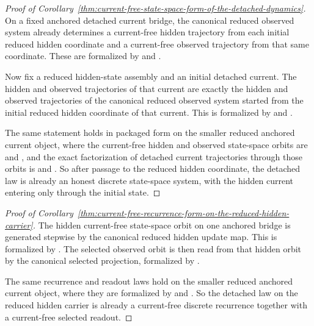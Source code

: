 \begin{proof}[Proof of Corollary~\ref{thm:current-free-state-space-form-of-the-detached-dynamics}]
\label{proof:thm:current-free-state-space-form-of-the-detached-dynamics}
On a fixed anchored detached current bridge, the canonical reduced observed
system already determines a current-free hidden trajectory from each initial
reduced hidden coordinate and a current-free observed trajectory from that same
coordinate. These are formalized by
and
.

Now fix a reduced hidden-state assembly and an initial detached current. The
hidden and observed trajectories of that current are exactly the hidden and
observed trajectories of the canonical reduced observed system started from the
initial reduced hidden coordinate of that current. This is formalized by
and
.

The same statement holds in packaged form on the smaller reduced anchored
current object, where the current-free hidden and observed state-space orbits
are
and
,
and the exact factorization of detached current trajectories through those
orbits is
and
.
So after passage to the reduced hidden coordinate, the detached law is already
an honest discrete state-space system, with the hidden current entering only
through the initial state.
\end{proof}

\begin{proof}[Proof of Corollary~\ref{thm:current-free-recurrence-form-on-the-reduced-hidden-carrier}]
\label{proof:thm:current-free-recurrence-form-on-the-reduced-hidden-carrier}
The hidden current-free state-space orbit on one anchored bridge is generated
stepwise by the canonical reduced hidden update map. This is formalized by
. The
selected observed orbit is then read from that hidden orbit by the canonical
selected projection, formalized by
.

The same recurrence and readout laws hold on the smaller reduced anchored
current object, where they are formalized by
and
.
So the detached law on the reduced hidden carrier is already a current-free
discrete recurrence together with a current-free selected readout.
\end{proof}

